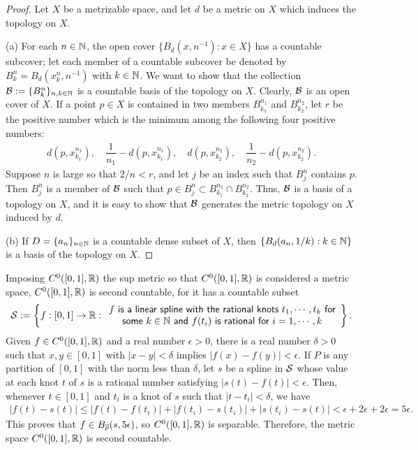 \begin{proof}
    \hangindent=0.65cm
    Let $X$ be a metrizable space, and let $d$ be a metric on $X$ which induces the topology on $X$.

    \noindent(a)
    For each $n\in{\mathbb{N}}$, the open cover $\{B_d\left(x, n^{-1}\right): x\in X\}$ has a countable subcover; let each member of a countable subcover be denoted by $B_k^n=B_d(x_k^n, n^{-1})$ with $k\in{\mathbb{N}}$.
    We want to show that the collection ${\mathcal{B}}:=\{B_k^n\}_{n, k\in{\mathbb{N}}}$ is a countable basis of the topology on $X$.
    Clearly, ${\mathcal{B}}$ is an open cover of $X$.
    If a point $p\in X$ is contained in two members $B_{k_1}^{n_1}$ and $B_{k_2}^{n_2}$, let $r$ be the positive number which is the minimum among the following four positive numbers:
    \begin{align*}
        d(p, x_{k_1}^{n_1}),\quad\dfrac{1}{n_1}-d(p, x_{k_1}^{n_1}),\quad d(p, x_{k_2}^{n_2}),\quad\dfrac{1}{n_2}-d(p, x_{k_2}^{n_2}).
    \end{align*}
    Suppose $n$ is large so that $2/n<r$, and let $j$ be an index such that $B_j^n$ contains $p$.
    Then $B_j^n$ is a member of ${\mathcal{B}}$ such that $p\in B_j^n\subset B_{k_1}^{n_1}\cap B_{k_2}^{n_2}$.
    Thus, ${\mathcal{B}}$ is a basis of a topology on $X$, and it is easy to show that ${\mathcal{B}}$ generates the metric topology on $X$ induced by $d$.

    \noindent(b)
    If $D=\{a_n\}_{n\in{\mathbb{N}}}$ is a countable dense subset of $X$, then $\{B_d(a_n, 1/k): k\in{\mathbb{N}}\}$ is a basis of the topology on $X$.
\end{proof}
\begin{exmp}
    Imposing $C^0([0, 1], {\mathbb{R}})$ the sup metric so that $C^0([0, 1], {\mathbb{R}})$ is considered a metric space, $C^0([0, 1], {\mathbb{R}})$ is second countable, for it has a countable subset
    \begin{align*}
        {\mathcal{S}}:=\left\{f: [0, 1]\rightarrow{\mathbb{R}}:
        \begin{array}{c}
            \textsf{$f$ is a linear spline with the rational knots $t_1, \cdots, t_k$ for}\\
            \textsf{some $k\in{\mathbb{N}}$ and $f(t_i)$ is rational for $i=1, \cdots, k$}
        \end{array}    
        \right\}.
    \end{align*}
    Given $f\in C^0([0, 1], {\mathbb{R}})$ and a real number $\epsilon>0$, there is a real number $\delta>0$ such that $x, y\in [0, 1]$ with $|x-y|<\delta$ implies $|f(x)-f(y)|<\epsilon$.
    If $P$ is any partition of $[0, 1]$ with the norm less than $\delta$, let $s$ be a spline in ${\mathcal{S}}$ whose value at each knot $t$ of $s$ is a rational number satisfying $|s(t)-f(t)|<\epsilon$.
    Then, whenever $t\in [0, 1]$ and $t_i$ is a knot of $s$ such that $|t-t_i|<\delta$, we have
    \begin{align*}
        |f(t)-s(t)| \leq |f(t)-f(t_i)| + |f(t_i)-s(t_i)| + |s(t_i)-s(t)| < \epsilon + 2\epsilon + 2\epsilon = 5\epsilon.
    \end{align*}
    This proves that $f\in B_{\overline{\rho}}(s, 5\epsilon)$, so $C^0([0, 1], {\mathbb{R}})$ is separable.
    Therefore, the metric space $C^0([0, 1], {\mathbb{R}})$ is second countable.
\end{exmp}

